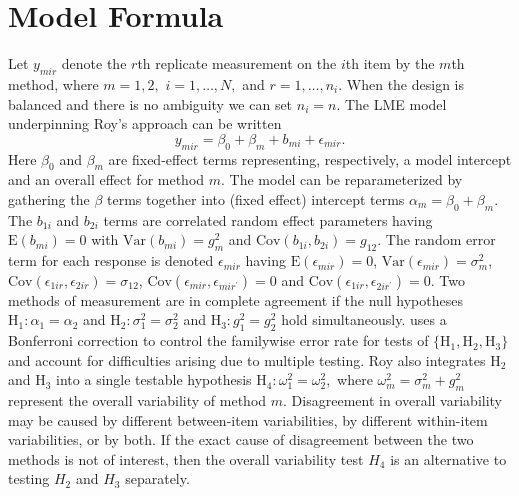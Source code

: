 \documentclass[12pt, a4paper]{report}
\theoremstyle{plain}
\theoremstyle{definition}
\theoremstyle{remark}
\begin{document}
\newpage

\section{Model Formula}

Let $y_{mir} $ denote the $r$th replicate measurement on the $i$th item by the $m$th method, where $m=1,2,$ $i=1,\ldots,N,$ and $r = 1,\ldots,n_i.$ When the design is balanced and there is no ambiguity we can set $n_i=n.$ The LME model underpinning Roy's approach can be written
\begin{equation}\label{Roy-model}
y_{mir} = \beta_{0} + \beta_{m} + b_{mi} + \epsilon_{mir}.
\end{equation}
Here $\beta_0$ and $\beta_m$ are fixed-effect terms representing, respectively, a model intercept and an overall effect for method $m.$ The model can be reparameterized by gathering the $\beta$ terms together into (fixed effect) intercept terms $\alpha_m=\beta_0+\beta_m.$ The $b_{1i}$ and $b_{2i}$ terms are correlated random effect parameters having $\mathrm{E}(b_{mi})=0$ with $\mathrm{Var}(b_{mi})=g^2_m$ and $\mathrm{Cov}(b_{1i}, b_{2 i})=g_{12}.$ The random error term for each response is denoted $\epsilon_{mir}$ having $\mathrm{E}(\epsilon_{mir})=0$, $\mathrm{Var}(\epsilon_{mir})=\sigma^2_m$, $\mathrm{Cov}(\epsilon_{1ir}, \epsilon_{2 ir})=\sigma_{12}$, $\mathrm{Cov}(\epsilon_{mir}, \epsilon_{mir^\prime})= 0$ and $\mathrm{Cov}(\epsilon_{1ir}, \epsilon_{2 ir^\prime})= 0.$ Two methods of measurement are in complete agreement if the null hypotheses $\mathrm{H}_1\colon \alpha_1 = \alpha_2$ and $\mathrm{H}_2\colon \sigma^2_1 = \sigma^2_2 $ and $\mathrm{H}_3\colon g^2_1= g^2_2$ hold simultaneously. \citet{roy} uses a Bonferroni correction to control the familywise error rate for tests of $\{\mathrm{H}_1, \mathrm{H}_2, \mathrm{H}_3\}$ and account for difficulties arising due to multiple testing. Roy also integrates $\mathrm{H}_2$ and $\mathrm{H}_3$ into a single testable hypothesis $\mathrm{H}_4\colon \omega^2_1=\omega^2_2,$ where $\omega^2_m = \sigma^2_m + g^2_m$ represent the overall variability of method $m.$  Disagreement in overall variability may be caused by different between-item variabilities, by different within-item variabilities, or by both.  If the exact cause of disagreement between the two methods is not of interest, then the overall variability test $H_4$ is an alternative to testing $H_2$ and $H_3$ separately.
\newpage
\end{document}
